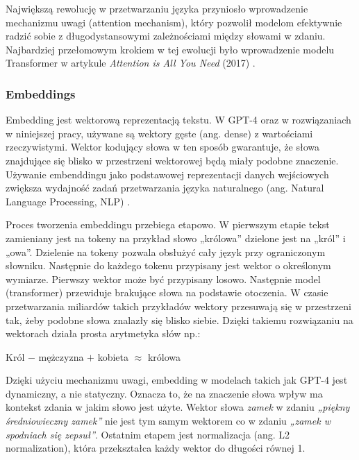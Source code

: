 \documentclass[
a4paper,
12pt,
]{article}
\begin{document}
Największą rewolucję w przetwarzaniu języka przyniosło wprowadzenie mechanizmu\linebreak{}
uwagi (attention mechanism), który pozwolił modelom efektywnie radzić sobie z długodystansowymi zależnościami między słowami w zdaniu. Najbardziej przełomowym krokiem w tej ewolucji było wprowadzenie modelu Transformer w artykule \textit{Attention is All You Need} (2017) \cite{attention_2023vaswani}.

\subsubsection{Embeddings}
Embedding jest wektorową reprezentacją tekstu. W GPT-4 oraz w rozwiązaniach w niniejszej pracy, używane są wektory gęste (ang. dense) z wartościami rzeczywistymi. Wektor kodujący słowa w ten sposób gwarantuje, że słowa znajdujące się blisko w przestrzeni wektorowej będą miały podobne znaczenie. Używanie embenddingu jako podstawowej reprezentacji danych wejściowych zwiększa wydajność zadań przetwarzania języka naturalnego (ang. Natural Language Processing, NLP) \cite{word_embedding}.

Proces tworzenia embeddingu przebiega etapowo. W pierwszym etapie tekst zamieniany jest na tokeny na przykład słowo „królowa” dzielone jest na „król” i „owa”. Dzielenie na tokeny pozwala obsłużyć cały język przy ograniczonym słowniku. Następnie do każdego tokenu przypisany jest wektor o określonym wymiarze. Pierwszy wektor może być przypisany losowo. Następnie model (transformer) przewiduje brakujące słowa na podstawie otoczenia. W czasie przetwarzania miliardów takich przykładów wektory przesuwają się w przestrzeni tak, żeby podobne słowa znalazły się blisko siebie. Dzięki takiemu rozwiązaniu na wektorach działa prosta arytmetyka słów np.:
\begin{center}
    Król $-$ mężczyzna $+$ kobieta $\approx$ królowa \cite{dense_vectors}
\end{center}

Dzięki użyciu mechanizmu uwagi, embedding w modelach takich jak GPT-4 jest dynamiczny, a nie statyczny. Oznacza to, że na znaczenie słowa wpływ ma kontekst zdania w jakim słowo jest użyte. Wektor słowa \textit{zamek} w zdaniu \textit{„piękny średniowieczny zamek”} nie jest tym samym wektorem co w zdaniu \textit{„zamek w spodniach się zepsuł”}. Ostatnim etapem jest normalizacja (ang. L2 normalization), która przekształca każdy wektor do długości równej 1.
\end{document}
